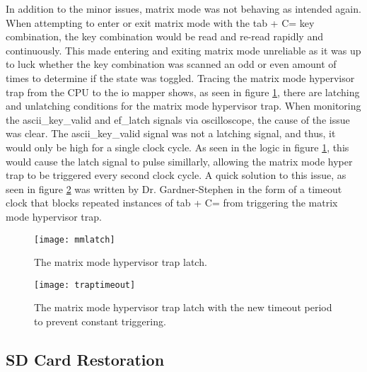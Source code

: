 In addition to the minor issues, matrix mode was not behaving as intended again. When attempting to enter or exit matrix mode with the tab + C= key combination, the key combination would be read and re-read rapidly and continuously. This made entering and exiting matrix mode unreliable as it was up to luck whether the key combination was scanned an odd or even amount of times to determine if the state was toggled. Tracing the matrix mode hypervisor trap from the CPU to the io mapper shows, as seen in figure \ref{fig:mmlatch}, there are latching and unlatching conditions for the matrix mode hypervisor trap. When monitoring the ascii\_key\_valid and ef\_latch signals via oscilloscope, the cause of the issue was clear. The ascii\_key\_valid signal was not a latching signal, and thus, it would only be high for a single clock cycle. As seen in the logic in figure \ref{fig:mmlatch}, this would cause the latch signal to pulse simillarly, allowing the matrix mode hyper trap to be triggered every second clock cycle. A quick solution to this issue, as seen in figure \ref{fig:traptimeout} was written by Dr. Gardner-Stephen in the form of a timeout clock that blocks repeated instances of tab + C= from triggering the matrix mode hypervisor trap.

\begin{figure}
  \centering
  \texttt{[image: mmlatch]}
  \caption{The matrix mode hypervisor trap latch.}
  \label{fig:mmlatch}
\end{figure}

\begin{figure}
  \centering
  \texttt{[image: traptimeout]}
  \caption{The matrix mode hypervisor trap latch with the new timeout period to prevent constant triggering.}
  \label{fig:traptimeout}
\end{figure}

\subsection{SD Card Restoration}

\label{Ch6 Sec2 Sub2}

